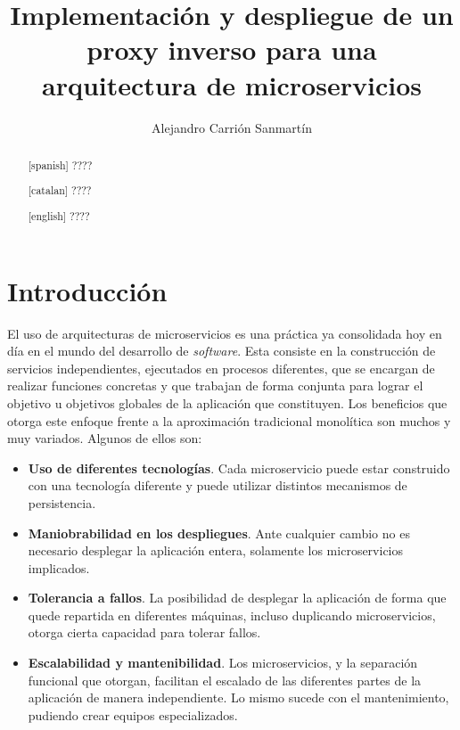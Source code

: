 \documentclass[11pt,spanish,listoffigures]{tfgetsinf}
\title{Implementación y despliegue de un proxy inverso para una arquitectura de microservicios}
\author{Alejandro Carrión Sanmartín}
\begin{document}

\begin{abstract}[spanish]
????
\end{abstract}
\begin{abstract}[catalan]
????
\end{abstract}
\begin{abstract}[english]
????
\end{abstract}

\mainmatter


\chapter{Introducción}

El uso de arquitecturas de microservicios es una práctica ya consolidada hoy en día en el mundo del desarrollo de \emph{software}. Esta consiste en la construcción de servicios independientes, ejecutados en procesos diferentes, que se encargan de realizar funciones concretas y que trabajan de forma conjunta para lograr el objetivo u objetivos globales de la aplicación que constituyen. Los beneficios que otorga este enfoque frente a la aproximación tradicional monolítica son muchos y muy variados. Algunos de ellos son:

\begin{itemize}

	\item \textbf{Uso de diferentes tecnologías}.
Cada microservicio puede estar construido con una tecnología diferente y puede utilizar distintos mecanismos de persistencia.

	\item \textbf{Maniobrabilidad en los despliegues}.
Ante cualquier cambio no es necesario desplegar la aplicación entera, solamente los microservicios implicados.

	\item \textbf{Tolerancia a fallos}.
La posibilidad de desplegar la aplicación de forma que quede repartida en diferentes máquinas, incluso duplicando microservicios, otorga cierta capacidad para tolerar fallos.

	\item \textbf{Escalabilidad y mantenibilidad}.
Los microservicios, y la separación funcional que otorgan, facilitan el escalado de las diferentes partes de la aplicación de manera independiente. Lo mismo sucede con el mantenimiento, pudiendo crear equipos especializados.

\end{itemize}
\end{document}
